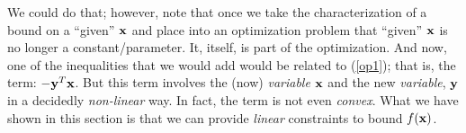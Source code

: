 \documentclass[12pt]{article}
\begin{document}
We could do that; however, note that once we take the characterization of a bound on a ``given'' ${\bf x}$ 
and place into an optimization problem that ``given'' ${\bf x}$ is no longer a constant/parameter.
It, itself, is part of the optimization. And now, one of the inequalities that we would add
would be related to (\ref{op1}); that is, the term: $-{\bf y}^T {\bf x}$. But this term
involves the (now) {\it variable\/} ${\bf x}$ and the new {\it variable\/}, ${\bf y}$ in a decidedly {\it non-linear\/} way.
In fact, the term is not even {\it convex\/}.
What we have shown in this section is that we can provide {\it linear\/} constraints to bound $f({\bf x})$.
\end{document}
